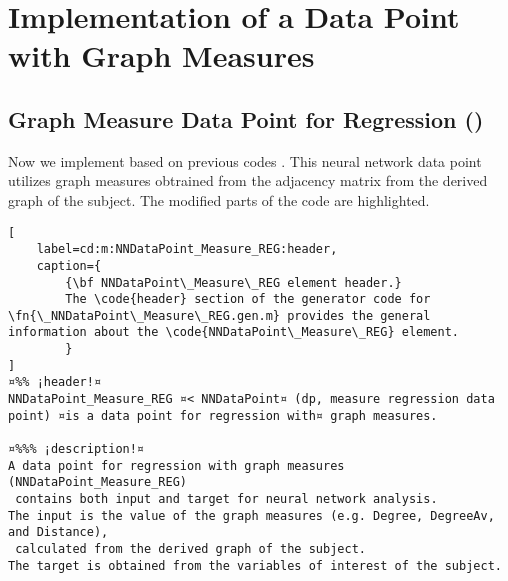 \documentclass{tufte-handout}
\begin{document}
\clearpage
\section{Implementation of a Data Point with Graph Measures}
\subsection{Graph Measure Data Point for Regression ()}

Now we implement  based on previous codes .
This neural network data point utilizes graph measures obtrained from the adjacency matrix from the derived graph of the subject. 
The modified parts of the code are highlighted.

\begin{lstlisting}[
	label=cd:m:NNDataPoint_Measure_REG:header,
	caption={
		{\bf NNDataPoint\_Measure\_REG element header.}
		The \code{header} section of the generator code for \fn{\_NNDataPoint\_Measure\_REG.gen.m} provides the general information about the \code{NNDataPoint\_Measure\_REG} element.
		}
]
¤%% ¡header!¤
NNDataPoint_Measure_REG ¤< NNDataPoint¤ (dp, measure regression data point) ¤is a data point for regression with¤ graph measures.

¤%%% ¡description!¤
A data point for regression with graph measures (NNDataPoint_Measure_REG) 
 contains both input and target for neural network analysis.
The input is the value of the graph measures (e.g. Degree, DegreeAv, and Distance), 
 calculated from the derived graph of the subject.
The target is obtained from the variables of interest of the subject.
\end{lstlisting}
\end{document}
